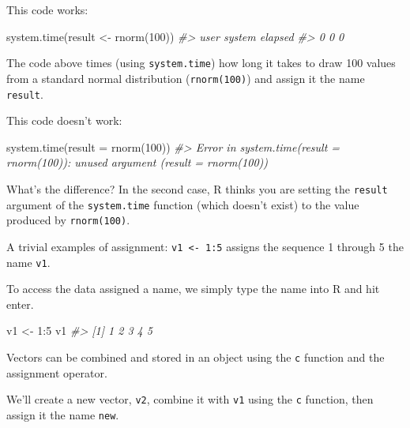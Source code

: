 \documentclass[
]{article}
\newenvironment{Shaded}{\begin{snugshade}}{\end{snugshade}}
\newcommand{\AttributeTok}[1]{\textcolor[rgb]{0.77,0.63,0.00}{#1}}
\newcommand{\CommentTok}[1]{\textcolor[rgb]{0.56,0.35,0.01}{\textit{#1}}}
\newcommand{\DecValTok}[1]{\textcolor[rgb]{0.00,0.00,0.81}{#1}}
\newcommand{\FunctionTok}[1]{\textcolor[rgb]{0.00,0.00,0.00}{#1}}
\newcommand{\NormalTok}[1]{#1}
\newcommand{\OtherTok}[1]{\textcolor[rgb]{0.56,0.35,0.01}{#1}}
\newcommand{\SpecialCharTok}[1]{\textcolor[rgb]{0.00,0.00,0.00}{#1}}
\begin{document}
This code works:

\begin{Shaded}
\begin{Highlighting}[]
\FunctionTok{system.time}\NormalTok{(result }\OtherTok{\textless{}{-}} \FunctionTok{rnorm}\NormalTok{(}\DecValTok{100}\NormalTok{))}
\CommentTok{\#\textgreater{}    user  system elapsed }
\CommentTok{\#\textgreater{}       0       0       0}
\end{Highlighting}
\end{Shaded}

The code above times (using \texttt{system.time}) how long it takes to
draw 100 values from a standard normal distribution
(\texttt{rnorm(100)}) and assign it the name \texttt{result}.

This code doesn't work:

\begin{Shaded}
\begin{Highlighting}[]
\FunctionTok{system.time}\NormalTok{(}\AttributeTok{result =} \FunctionTok{rnorm}\NormalTok{(}\DecValTok{100}\NormalTok{))}
\CommentTok{\#\textgreater{} Error in system.time(result = rnorm(100)): unused argument (result = rnorm(100))}
\end{Highlighting}
\end{Shaded}

What's the difference? In the second case, R thinks you are setting the
\texttt{result} argument of the \texttt{system.time} function (which
doesn't exist) to the value produced by \texttt{rnorm(100)}.

A trivial examples of assignment: \texttt{v1\ \textless{}-\ 1:5} assigns
the sequence 1 through 5 the name \texttt{v1}.

To access the data assigned a name, we simply type the name into R and
hit enter.

\begin{Shaded}
\begin{Highlighting}[]
\NormalTok{v1 }\OtherTok{\textless{}{-}} \DecValTok{1}\SpecialCharTok{:}\DecValTok{5}
\NormalTok{v1}
\CommentTok{\#\textgreater{} [1] 1 2 3 4 5}
\end{Highlighting}
\end{Shaded}

Vectors can be combined and stored in an object using the \texttt{c}
function and the assignment operator.

We'll create a new vector, \texttt{v2}, combine it with \texttt{v1}
using the \texttt{c} function, then assign it the name \texttt{new}.
\end{document}
